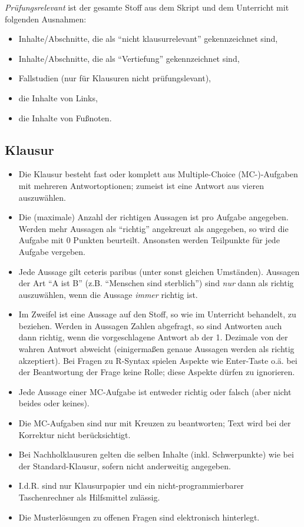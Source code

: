 \documentclass[12pt,ngerman,]{book}
\providecommand{\tightlist}{%
  \setlength{\itemsep}{0pt}\setlength{\parskip}{0pt}}
\begin{document}
\emph{Prüfungsrelevant} ist der gesamte Stoff aus dem Skript und dem
Unterricht mit folgenden Ausnahmen:

\begin{itemize}
\tightlist
\item
  Inhalte/Abschnitte, die als ``nicht klausurrelevant'' gekennzeichnet
  sind,
\item
  Inhalte/Abschnitte, die als ``Vertiefung'' gekennzeichnet sind,
\item
  Fallstudien (nur für Klausuren nicht prüfungslevant),
\item
  die Inhalte von Links,
\item
  die Inhalte von Fußnoten.
\end{itemize}

\subsection{Klausur}\label{klausur}

\begin{itemize}
\item
  Die Klausur besteht fast oder komplett aus Multiple-Choice
  (MC-)-Aufgaben mit mehreren Antwortoptionen; zumeist ist eine Antwort
  aus vieren auszuwählen.
\item
  Die (maximale) Anzahl der richtigen Aussagen ist pro Aufgabe
  angegeben. Werden mehr Aussagen als ``richtig'' angekreuzt als
  angegeben, so wird die Aufgabe mit 0 Punkten beurteilt. Ansonsten
  werden Teilpunkte für jede Aufgabe vergeben.
\item
  Jede Aussage gilt ceteris paribus (unter sonst gleichen Umständen).
  Aussagen der Art ``A ist B'' (z.B. ``Menschen sind sterblich'') sind
  \emph{nur} dann als richtig auszuwählen, wenn die Aussage \emph{immer}
  richtig ist.
\item
  Im Zweifel ist eine Aussage auf den Stoff, so wie im Unterricht
  behandelt, zu beziehen. Werden in Aussagen Zahlen abgefragt, so sind
  Antworten auch dann richtig, wenn die vorgeschlagene Antwort ab der 1.
  Dezimale von der wahren Antwort abweicht (einigermaßen genaue Aussagen
  werden als richtig akzeptiert). Bei Fragen zu R-Syntax spielen Aspekte
  wie Enter-Taste o.ä. bei der Beantwortung der Frage keine Rolle; diese
  Aspekte dürfen zu ignorieren.
\item
  Jede Aussage einer MC-Aufgabe ist entweder richtig oder falsch (aber
  nicht beides oder keines).
\item
  Die MC-Aufgaben sind nur mit Kreuzen zu beantworten; Text wird bei der
  Korrektur nicht berücksichtigt.
\item
  Bei Nachholklausuren gelten die selben Inhalte (inkl. Schwerpunkte)
  wie bei der Standard-Klausur, sofern nicht anderweitig angegeben.
\item
  I.d.R. sind nur Klausurpapier und ein nicht-programmierbarer
  Taschenrechner als Hilfsmittel zulässig.
\item
  Die Musterlösungen zu offenen Fragen sind elektronisch hinterlegt.
\end{itemize}
\end{document}
